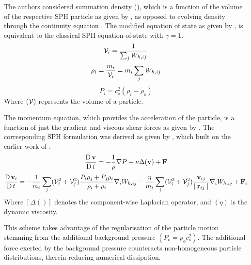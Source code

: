 The authors considered summation density (), which is a function of the volume of the respective SPH particle as given by , as opposed to evolving density through the continuity equation \parencite{hu2006multi}. The modified equation of state as given by , is equivalent to the classical SPH equation-of-state with $\gamma=1$.
\begin{equation}
    \Vol_i = \frac{1}{\sum_j \WIJ}
    \label{eq:Adami2012-vol}
\end{equation}
\begin{equation}
    \rho_i = \frac{m_i}{\Vol_i} = m_i\sum_j \WIJ
    \label{eq:Adami2012-summation-density}
\end{equation}
\begin{equation}
    P_i = c_s^2 (\rho_i - \rho_o)
    \label{eq:Adami2012-eos}
\end{equation}
Where $(\mathcal{V})$ represents the volume of a particle.

The momentum equation, which provides the acceleration of the particle, is a function of just the gradient and viscous shear forces as given by . The corresponding SPH formulation was derived as given by , which built on the earlier work of \cite{hu2007incompressible}.
\begin{equation}
    \LagDerivative{\vect{v}} = -\frac{1}{\rho}\nabla P + \nu \Delta( \vect{v} ) + \vect{F}
    \label{eq:Adami2012-mom-governing}
\end{equation}
\begin{equation}
    \LagDerivative{\vect{v}_i} = -\frac{1}{m_i} \sum_j (\Vol^2_i + \Vol^2_j) \frac{P_i \rho_j + P_j \rho_i}{\rho_i + \rho_i} \DWIJ - \frac{\eta}{m_i} \sum_j (\Vol^2_i + \Vol^2_j) \frac{\VIJ}{\RtwoIJ[]}\DWIJ + \vect{F}_i
    \label{eq:Adami2012-mom-sph}
\end{equation}
Where $[\Delta ()]$ denotes the component-wise Laplacian operator, and $(\eta)$ is the dynamic viscosity.

This scheme takes advantage of the regularisation of the
particle motion stemming from the additional background pressure $(P_o = \rho_o c_s^2)$. The additional force exerted by the background pressure counteracts non-homogeneous particle distributions, therein reducing numerical dissipation.

